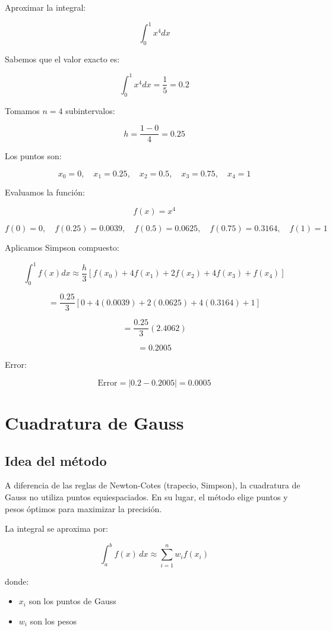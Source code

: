 \documentclass[12pt,a4paper]{article}
\begin{document}
Aproximar la integral:

\[
\int_0^1 x^4 dx
\]

Sabemos que el valor exacto es:

\[
\int_0^1 x^4 dx = \frac{1}{5} = 0.2
\]

Tomamos $n=4$ subintervalos:

\[
h = \frac{1-0}{4} = 0.25
\]

Los puntos son:

\[
x_0 = 0,\quad x_1 = 0.25,\quad x_2 = 0.5,\quad x_3 = 0.75,\quad x_4 = 1
\]

Evaluamos la función:

\[
f(x) = x^4
\]

\[
f(0)=0,\quad f(0.25)=0.0039,\quad f(0.5)=0.0625,\quad f(0.75)=0.3164,\quad f(1)=1
\]

Aplicamos Simpson compuesto:

\[
\int_0^1 f(x)dx \approx \frac{h}{3}
\left[
f(x_0) + 4f(x_1) + 2f(x_2) + 4f(x_3) + f(x_4)
\right]
\]

\[
= \frac{0.25}{3}
\left[
0 + 4(0.0039) + 2(0.0625) + 4(0.3164) + 1
\right]
\]

\[
= \frac{0.25}{3} (2.4062)
\]

\[
= 0.2005
\]

Error:

\[
\text{Error} = |0.2 - 0.2005| = 0.0005
\]


\newpage

\section{Cuadratura de Gauss}

\subsection{Idea del método}

A diferencia de las reglas de Newton-Cotes (trapecio, Simpson), la cuadratura de Gauss
no utiliza puntos equiespaciados. En su lugar, el método elige puntos y pesos óptimos
para maximizar la precisión.

La integral se aproxima por:

\[
\int_a^b f(x)\,dx \approx \sum_{i=1}^{n} w_i f(x_i)
\]

donde:
\begin{itemize}
\item $x_i$ son los puntos de Gauss
\item $w_i$ son los pesos
\end{itemize}
\end{document}
